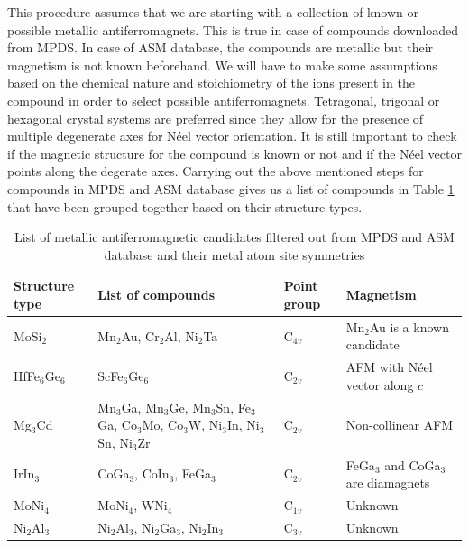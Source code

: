 \documentclass[letterpaper,10pt,doublespacing,edeposit]{uiucthesis2020}
\begin{document}
\begin{mainmatter}
This procedure assumes that we are starting with a collection of known or possible metallic antiferromagnets. This is true in case of compounds downloaded from MPDS. In case of ASM database, the compounds are metallic but their magnetism is not known beforehand. We will have to make some assumptions based on the chemical nature and stoichiometry of the ions present in the compound in order to select possible antiferromagnets. Tetragonal, trigonal or hexagonal crystal systems are preferred since they allow for the presence of multiple degenerate axes for N\'eel vector orientation. It is still important to check if the magnetic structure for the compound is known or not and if the N\'eel vector points along the degerate axes. Carrying out the above mentioned steps for compounds in MPDS and ASM database gives us a list of compounds  in Table \ref{tab:metallic_afm_candidates} that have been grouped together based on their structure types.

\renewcommand{\arraystretch}{1.2}
\begin{table}
\caption{\label{tab:metallic_afm_candidates} 
List of metallic antiferromagnetic candidates filtered out from MPDS and ASM database and their metal atom site symmetries}
\centering
\begin{tabular}{>{\raggedright\arraybackslash}p{3cm}>{\raggedright\arraybackslash}p{4cm}>{\centering}p{3cm}>{\raggedright\arraybackslash}p{4cm}}
\hline\hline
\textbf{Structure type} & \textbf{List of compounds} & \textbf{Point group} & \textbf{Magnetism}\\
\hline
MoSi$_2$ & Mn$_2$Au, Cr$_2$Al, Ni$_2$Ta & C$_{4v}$ & Mn$_2$Au is a known candidate\\
\hline
HfFe$_6$Ge$_6$ & ScFe$_6$Ge$_6$ & C$_{2v}$ & AFM with N\'eel vector along $c$\\
\hline
Mg$_3$Cd & Mn$_3$Ga, Mn$_3$Ge, Mn$_3$Sn, Fe$_3$Ga, Co$_3$Mo, Co$_3$W, Ni$_3$In, Ni$_3$Sn, Ni$_3$Zr & C$_{2v}$ & Non-collinear AFM\\
\hline
IrIn$_3$ & CoGa$_3$, CoIn$_3$, FeGa$_3$ & C$_{2v}$ & FeGa$_3$ and CoGa$_3$ are diamagnets\\
\hline
MoNi$_4$ & MoNi$_4$, WNi$_4$ & C$_{1v}$ & Unknown\\
\hline
Ni$_2$Al$_3$ & Ni$_2$Al$_3$, Ni$_2$Ga$_3$, Ni$_2$In$_3$ & C$_{3v}$ & Unknown\\
\hline\hline
\end{tabular}
~\\
\end{table}


\end{mainmatter}
\end{document}
